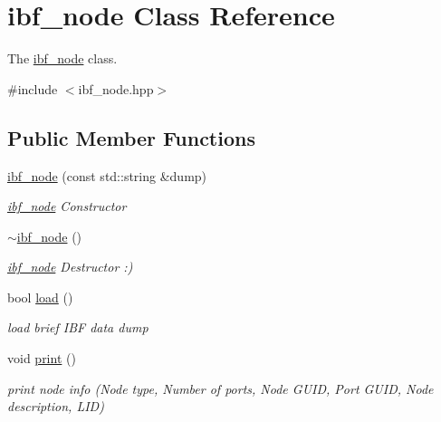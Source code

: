 \hypertarget{classibf__node}{}\section{ibf\+\_\+node Class Reference}
\label{classibf__node}


The \mbox{\hyperlink{classibf__node}{ibf\+\_\+node}} class.  




{\ttfamily \#include $<$ibf\+\_\+node.\+hpp$>$}

\subsection*{Public Member Functions}
\begin{DoxyCompactItemize}
\item 
\mbox{\hyperlink{classibf__node_a523e0518169d8e30b68d9188a51b6c1a}{ibf\+\_\+node}} (const std\+::string \&dump)
\begin{DoxyCompactList}\small\item\em \mbox{\hyperlink{classibf__node}{ibf\+\_\+node}} Constructor \end{DoxyCompactList}\item 
\mbox{\label{classibf__node_a7c1bd854dcd000836d893a20cb3f4864}} 
\mbox{\hyperlink{classibf__node_a7c1bd854dcd000836d893a20cb3f4864}{$\sim$ibf\+\_\+node}} ()
\begin{DoxyCompactList}\small\item\em \mbox{\hyperlink{classibf__node}{ibf\+\_\+node}} Destructor \+:) \end{DoxyCompactList}\item 
bool \mbox{\hyperlink{classibf__node_ab9fb02d662040776f493cecc38b8d09a}{load}} ()
\begin{DoxyCompactList}\small\item\em load brief I\+BF data dump \end{DoxyCompactList}\item 
\mbox{\label{classibf__node_a6ad6f5730885761558dbcdd49a476246}} 
void \mbox{\hyperlink{classibf__node_a6ad6f5730885761558dbcdd49a476246}{print}} ()
\begin{DoxyCompactList}\small\item\em print node info (Node type, Number of ports, Node G\+U\+ID, Port G\+U\+ID, Node description, L\+ID) \end{DoxyCompactList}\item 

\end{DoxyCompactItemize}
